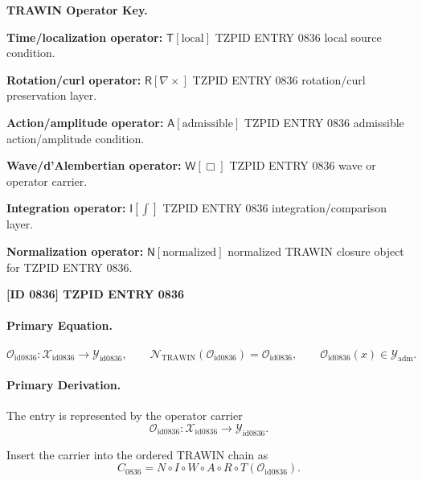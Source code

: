 \par\vspace{0.45\baselineskip}
\noindent\begin{minipage}[t]{\linewidth}
\begingroup
\small
\raggedright
\textbf{TRAWIN Operator Key.}\par
\noindent\textbf{Time/localization operator:} $\mathsf{T}\!\left[\mathrm{local}\right]$ TZPID ENTRY 0836 local source condition.\par
\noindent\textbf{Rotation/curl operator:} $\mathsf{R}\!\left[\nabla\times\right]$ TZPID ENTRY 0836 rotation/curl preservation layer.\par
\noindent\textbf{Action/amplitude operator:} $\mathsf{A}\!\left[\mathrm{admissible}\right]$ TZPID ENTRY 0836 admissible action/amplitude condition.\par
\noindent\textbf{Wave/d'Alembertian operator:} $\mathsf{W}\!\left[\Box\right]$ TZPID ENTRY 0836 wave or operator carrier.\par
\noindent\textbf{Integration operator:} $\mathsf{I}\!\left[\int\right]$ TZPID ENTRY 0836 integration/comparison layer.\par
\noindent\textbf{Normalization operator:} $\mathsf{N}\!\left[\mathrm{normalized}\right]$ normalized TRAWIN closure object for TZPID ENTRY 0836.\par
\endgroup
\end{minipage}

\clearpage
\noindent\textbf{[ID 0836] TZPID ENTRY 0836}\par
\vspace{0.35em}
\paragraph{Primary Equation.}
\[
\mathcal{O}_{\mathrm{id0836}}:\mathcal{X}_{\mathrm{id0836}}\longrightarrow \mathcal{Y}_{\mathrm{id0836}},\qquad
\mathcal{N}_{\mathrm{TRAWIN}}(\mathcal{O}_{\mathrm{id0836}})=\mathcal{O}_{\mathrm{id0836}},\qquad
\mathcal{O}_{\mathrm{id0836}}(x)\in\mathcal{Y}_{\mathrm{adm}}.
\]

\paragraph{Primary Derivation.} The entry is represented by the operator carrier\[
\mathcal{O}_{\mathrm{id0836}}:\mathcal{X}_{\mathrm{id0836}}\longrightarrow \mathcal{Y}_{\mathrm{id0836}}.
\]

Insert the carrier into the ordered TRAWIN chain as\[
C_{0836}=N\circ I\circ W\circ A\circ R\circ T(\mathcal{O}_{\mathrm{id0836}}).
\]

